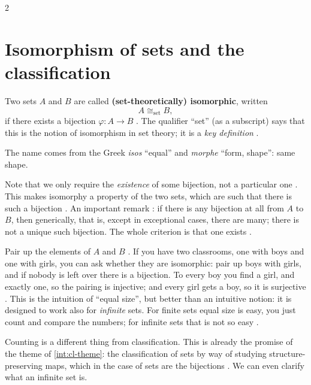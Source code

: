 \begin{paracol}{2}
\section{Isomorphism of sets and the classification}\label{sec:cl-iso}

\begin{definition}\label{def:cl-iso}
Two sets $A$ and $B$ are called \textbf{(set-theoretically) isomorphic}, written
\[
  A\cong_{\mathrm{set}}B,
\]
if there exists a bijection $\varphi\colon A\to B$ . The qualifier ``set'' (as a
subscript) says that this is the notion of isomorphism in set theory; it is a \emph{key definition}
.
\end{definition}
The name comes from the Greek \emph{isos} ``equal'' and \emph{morphe} ``form, shape'': same shape.

Note that we only require the \emph{existence} of some bijection, not a particular one . This makes
isomorphy a property of the two sets, which are such that there is such a bijection . An important remark
: if there is any bijection at all from $A$ to $B$, then generically, that is, except in exceptional
cases, there are many; there is not a unique such bijection. The whole criterion is that one exists .

\begin{intuition}\label{int:cl-classrooms}
Pair up the elements of $A$ and $B$ . If you have two classrooms, one with boys and one with girls, you
can ask whether they are isomorphic: pair up boys with girls, and if nobody is left over there is a bijection. To
every boy you find a girl, and exactly one, so the pairing is injective; and every girl gets a boy, so it is surjective
. This is the intuition of ``equal size'', but better than an intuitive notion: it is
designed to work also for \emph{infinite} sets. For finite sets equal size is easy, you just count and compare the
numbers; for infinite sets that is not so easy .
\end{intuition}

Counting is a different thing from classification. This is already the promise of the theme of \cref{int:cl-theme}: the
classification of sets by way of studying structure-preserving maps, which in the case of sets are the bijections
. We can even clarify what an infinite set is.


\end{paracol}
